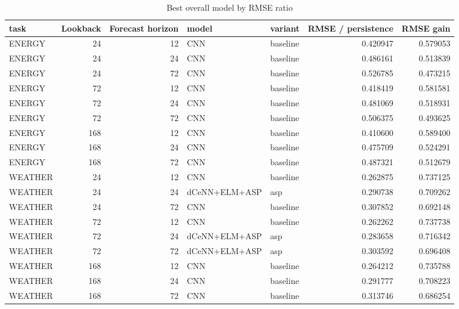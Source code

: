 \begin{table}
\caption{Best overall model by RMSE ratio}
\begin{tabular}{lrrllrr}
\toprule
task & Lookback & Forecast horizon & model & variant & RMSE / persistence & RMSE gain \\
\midrule
ENERGY & 24 & 12 & CNN & baseline & 0.420947 & 0.579053 \\
ENERGY & 24 & 24 & CNN & baseline & 0.486161 & 0.513839 \\
ENERGY & 24 & 72 & CNN & baseline & 0.526785 & 0.473215 \\
ENERGY & 72 & 12 & CNN & baseline & 0.418419 & 0.581581 \\
ENERGY & 72 & 24 & CNN & baseline & 0.481069 & 0.518931 \\
ENERGY & 72 & 72 & CNN & baseline & 0.506375 & 0.493625 \\
ENERGY & 168 & 12 & CNN & baseline & 0.410600 & 0.589400 \\
ENERGY & 168 & 24 & CNN & baseline & 0.475709 & 0.524291 \\
ENERGY & 168 & 72 & CNN & baseline & 0.487321 & 0.512679 \\
WEATHER & 24 & 12 & CNN & baseline & 0.262875 & 0.737125 \\
WEATHER & 24 & 24 & dCeNN+ELM+ASP & asp & 0.290738 & 0.709262 \\
WEATHER & 24 & 72 & CNN & baseline & 0.307852 & 0.692148 \\
WEATHER & 72 & 12 & CNN & baseline & 0.262262 & 0.737738 \\
WEATHER & 72 & 24 & dCeNN+ELM+ASP & asp & 0.283658 & 0.716342 \\
WEATHER & 72 & 72 & dCeNN+ELM+ASP & asp & 0.303592 & 0.696408 \\
WEATHER & 168 & 12 & CNN & baseline & 0.264212 & 0.735788 \\
WEATHER & 168 & 24 & CNN & baseline & 0.291777 & 0.708223 \\
WEATHER & 168 & 72 & CNN & baseline & 0.313746 & 0.686254 \\
\bottomrule
\end{tabular}
\end{table}
